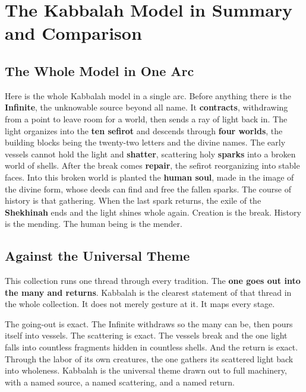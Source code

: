 \section{The Kabbalah Model in Summary and Comparison}

\subsection{The Whole Model in One Arc}

Here is the whole Kabbalah model in a single arc. Before anything there is the
\textbf{Infinite}, the unknowable source beyond all name. It \textbf{contracts},
withdrawing from a point to leave room for a world, then sends a ray of light back
in. The light organizes into the \textbf{ten sefirot} and descends through
\textbf{four worlds}, the building blocks being the twenty-two letters and the
divine names. The early vessels cannot hold the light and \textbf{shatter},
scattering holy \textbf{sparks} into a broken world of shells. After the break
comes \textbf{repair}, the sefirot reorganizing into stable faces. Into this broken
world is planted the \textbf{human soul}, made in the image of the divine form,
whose deeds can find and free the fallen sparks. The course of history is that
gathering. When the last spark returns, the exile of the \textbf{Shekhinah} ends
and the light shines whole again. Creation is the break. History is the mending.
The human being is the mender.

\subsection{Against the Universal Theme}

This collection runs one thread through every tradition. The \textbf{one goes out into
the many and returns}. Kabbalah is the clearest statement of that thread in the
whole collection. It does not merely gesture at it. It maps every stage.

The going-out is exact. The Infinite withdraws so the many can be, then pours
itself into vessels. The scattering is exact. The vessels break and the one light
falls into countless fragments hidden in countless shells. And the return is
exact. Through the labor of its own creatures, the one gathers its scattered light
back into wholeness. Kabbalah is the universal theme drawn out to full machinery,
with a named source, a named scattering, and a named return.

